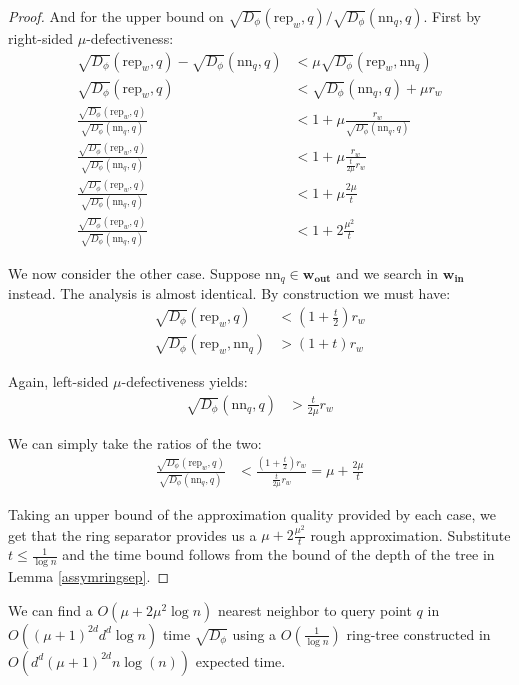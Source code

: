 \documentclass[11pt]{myclass}
\newcommand{\breg}{\ensuremath{D_\phi}}
\begin{document}
\begin{proof}
And for the upper bound on $\sqrt{\breg}(\text{rep}_w,q)/\sqrt{\breg}(\text{nn}_q,q)$. First by right-sided $\mu$-defectiveness:
\begin{align*}
\sqrt{\breg}(\text{rep}_w,q) - \sqrt{\breg}(\text{nn}_q,q) &< \mu \sqrt{\breg}( \text{rep}_w, \text{nn}_q) 
\\ \sqrt{\breg}(\text{rep}_w,q)  &< \sqrt{\breg}(\text{nn}_q,q) + \mu  r_w
\\ \frac {\sqrt{\breg}(\text{rep}_w,q)}{\sqrt{\breg}(\text{nn}_q,q)} &< 1 + \mu  \frac{r_w}{\sqrt{\breg}( \text{nn}_q,q)} 
\\ \frac{\sqrt{\breg}(\text{rep}_w,q)}{\sqrt{\breg}(\text{nn}_q,q)} &< 1 + \mu \frac{r_w}{\frac{t}{2 \mu}r_w} 
\\ \frac{\sqrt{\breg}(\text{rep}_w,q)}{\sqrt{\breg}(\text{nn}_q,q)} &< 1 + \mu \frac{2 \mu}{t} 
\\ \frac{\sqrt{\breg}(\text{rep}_w,q)}{\sqrt{\breg}(\text{nn}_q,q)} &< 1 + 2 \frac{\mu^2}{t}
\end{align*}

We now consider the other case. Suppose $\text{nn}_q \in \mathbf{w_{\text{out}}}$ and we search in $\mathbf{w_{\text{in}}}$ instead. The analysis is almost identical. By construction we must have:
\begin{align*}
\sqrt{\breg}(\text{rep}_w, q) &< \left( 1 + \frac{t}{2} \right) r_w 
 \\\sqrt{\breg}(\text{rep}_w, \text{nn}_q) &> ( 1 + t) r_w 
\end{align*}

Again, left-sided $\mu$-defectiveness yields:
\begin{align*}
\sqrt{\breg}(\text{nn}_q,q) &> \frac{t}{2 \mu} r_w
\end{align*}

We can simply take the ratios of the two:
\begin{align*}
\frac{\sqrt{\breg}(\text{rep}_w,q)}{\sqrt{\breg}( \text{nn}_q,q)} &< \frac{(1 + \frac{t}{2}) r_w}{\frac{t}{2 \mu} r_w } = \mu + \frac{2 \mu}{t}
\end{align*}

Taking an upper bound of the approximation quality provided by each case, we get that the ring separator provides us a $\mu + 2 \frac{\mu^2}{t}$ rough approximation.
Substitute  $t \leq \frac{1}{\log n}$ and the time bound follows from the bound of the depth of the tree in Lemma \ref{assymringsep}.
\end{proof}

\begin{corollary}
 We can find a $O(\mu + 2 \mu^2 \log n)$ nearest neighbor to query point $q$ in $O( (\mu+1)^{2d} d^d \log n)$ time $\sqrt{\breg}$ using a $O(\frac{1}{\log n})$ ring-tree constructed in
 $O(d^d (\mu+1)^{2d} n \log(n))$ expected time.
\end{corollary}
\end{document}
